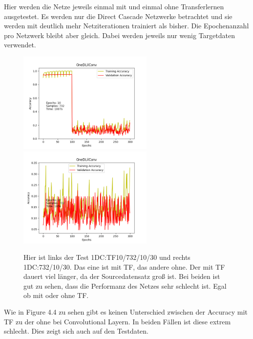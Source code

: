 Hier werden die Netze jeweils einmal mit und einmal ohne Transferlernen ausgetestet. Es werden nur die Direct Cascade Netzwerke betrachtet und 
sie werden mit deutlich mehr Netziterationen trainiert als bisher. Die Epochenanzahl pro Netzwerk bleibt aber gleich. Dabei werden jeweils nur 
wenig Targetdaten verwendet. 

\begin{figure}[htpb]
    \includegraphics[height=5cm]{../../Plots/ba_plots/classTF/1dc_tr.png}
    \includegraphics[height=5cm]{../../Plots/ba_plots/classTF/wo1dc_tr.png}
    \caption{\label{fig:1dc_tr} 
    \small{Hier ist links der Test 1DC:TF10/732/10/30 und rechts 1DC:732/10/30. Das eine ist mit TF, das andere ohne. Der mit TF dauert viel länger, 
    da der Sourcedatensatz groß ist. Bei beiden ist gut zu sehen, dass die Performanz des Netzes sehr schlecht ist. Egal ob mit oder ohne TF.}}
\end{figure}

Wie in Figure 4.4 zu sehen gibt es keinen Unterschied zwischen der Accuracy mit TF zu der ohne bei Convolutional Layern. In beiden Fällen ist diese 
extrem schlecht. Dies zeigt sich auch auf den Testdaten. 

